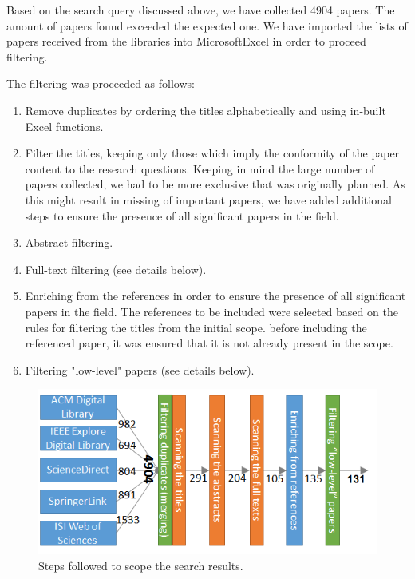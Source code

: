 \documentclass[ngerman,UKenglish,table]{scrbook}
\begin{document}
Based on the search query discussed above, we have collected 4904 papers.
The amount of papers found exceeded the expected one.
We have imported the lists of papers received from the libraries into MicrosoftExcel in order to proceed filtering.

The filtering was proceeded as follows:
\begin{enumerate}
\item Remove duplicates by ordering the titles alphabetically and using in-built Excel functions.
\item Filter the titles, keeping only those which imply the conformity of the paper content to the research questions.
Keeping in mind the large number of papers collected, we had to be more exclusive that was originally planned.
As this might result in missing of important papers, we have added additional steps to ensure the presence of all significant papers in the field.
\item Abstract filtering.
\item Full-text filtering (see details below).
\item Enriching from the references in order to ensure the presence of all significant papers in the field. 
The references to be included were selected based on the rules for filtering the titles from the initial scope.
before including the referenced paper, it was ensured that it is not already present in the scope.
\item Filtering "low-level" papers (see details below).
\end{enumerate}

\begin{figure}
\centering
\includegraphics[scale=1]{images/papers_filtering.png}
\caption{Steps followed to scope the search results.}
\label{fig:papers_filtering}
\end{figure}
\end{document}
